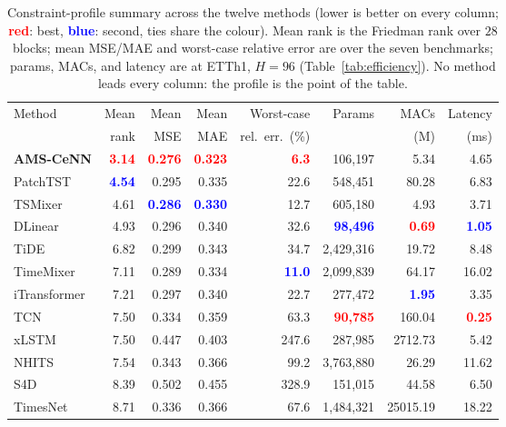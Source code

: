 \begin{table}[!t]
\centering
\caption{Constraint-profile summary across the twelve methods (lower is better on every column; \textcolor{red}{\textbf{red}}: best, \textcolor{blue}{\textbf{blue}}: second, ties share the colour). Mean rank is the Friedman rank over $28$ blocks; mean MSE/MAE and worst-case relative error are over the seven benchmarks; params, MACs, and latency are at ETTh1, $H{=}96$ (Table~\ref{tab:efficiency}). No method leads every column: the profile is the point of the table.}
\label{tab:profile}
\footnotesize
\setlength{\tabcolsep}{5pt}
\begin{tabular}{l rrr r rrr}
\toprule
Method & Mean & Mean & Mean & Worst-case & Params & MACs & Latency \\
 & rank & MSE & MAE & rel.\ err.\ (\%) & & (M) & (ms) \\
\midrule
\textbf{AMS-CeNN} & \textcolor{red}{\textbf{3.14}} & \textcolor{red}{\textbf{0.276}} & \textcolor{red}{\textbf{0.323}} & \textcolor{red}{\textbf{6.3}} & 106{,}197 & 5.34 & 4.65 \\
PatchTST & \textcolor{blue}{\textbf{4.54}} & 0.295 & 0.335 & 22.6 & 548{,}451 & 80.28 & 6.83 \\
TSMixer & 4.61 & \textcolor{blue}{\textbf{0.286}} & \textcolor{blue}{\textbf{0.330}} & 12.7 & 605{,}180 & 4.93 & 3.71 \\
DLinear & 4.93 & 0.296 & 0.340 & 32.6 & \textcolor{blue}{\textbf{98{,}496}} & \textcolor{red}{\textbf{0.69}} & \textcolor{blue}{\textbf{1.05}} \\
TiDE & 6.82 & 0.299 & 0.343 & 34.7 & 2{,}429{,}316 & 19.72 & 8.48 \\
TimeMixer & 7.11 & 0.289 & 0.334 & \textcolor{blue}{\textbf{11.0}} & 2{,}099{,}839 & 64.17 & 16.02 \\
iTransformer & 7.21 & 0.297 & 0.340 & 22.7 & 277{,}472 & \textcolor{blue}{\textbf{1.95}} & 3.35 \\
TCN & 7.50 & 0.334 & 0.359 & 63.3 & \textcolor{red}{\textbf{90{,}785}} & 160.04 & \textcolor{red}{\textbf{0.25}} \\
xLSTM & 7.50 & 0.447 & 0.403 & 247.6 & 287{,}985 & 2712.73 & 5.42 \\
NHITS & 7.54 & 0.343 & 0.366 & 99.2 & 3{,}763{,}880 & 26.29 & 11.62 \\
S4D & 8.39 & 0.502 & 0.455 & 328.9 & 151{,}015 & 44.58 & 6.50 \\
TimesNet & 8.71 & 0.336 & 0.366 & 67.6 & 1{,}484{,}321 & 25015.19 & 18.22 \\
\bottomrule
\end{tabular}
\end{table}
